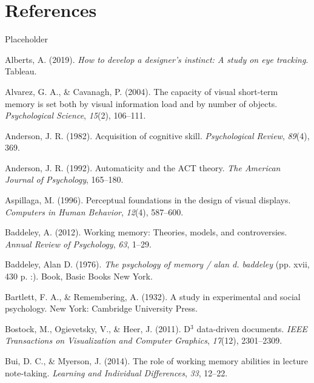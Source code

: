 \documentclass[print]{nuthesis}
\newlength{\cslhangindent}
\newenvironment{CSLReferences}[2]%
{\setlength{\parindent}{0pt}%
\everypar{\setlength{\hangindent}{\cslhangindent}}\ignorespaces}%
{\par}
\begin{document}
\hypertarget{references}{%
\chapter*{References}\label{references}}

Placeholder

\hypertarget{refs}{}
\begin{CSLReferences}{1}{0}
\leavevmode{}%
Alberts, A. (2019). \emph{How to develop a designer's instinct: A study on eye tracking}. Tableau.

\leavevmode{}%
Alvarez, G. A., \& Cavanagh, P. (2004). The capacity of visual short-term memory is set both by visual information load and by number of objects. \emph{Psychological Science}, \emph{15}(2), 106--111.

\leavevmode{}%
Anderson, J. R. (1982). Acquisition of cognitive skill. \emph{Psychological Review}, \emph{89}(4), 369.

\leavevmode{}%
Anderson, J. R. (1992). Automaticity and the ACT theory. \emph{The American Journal of Psychology}, 165--180.

\leavevmode{}%
Aspillaga, M. (1996). Perceptual foundations in the design of visual displays. \emph{Computers in Human Behavior}, \emph{12}(4), 587--600.

\leavevmode{}%
Baddeley, A. (2012). Working memory: Theories, models, and controversies. \emph{Annual Review of Psychology}, \emph{63}, 1--29.

\leavevmode{}%
Baddeley, Alan D. (1976). \emph{The psychology of memory / alan d. baddeley} (pp. xvii, 430 p. :). Book, Basic Books New York.

\leavevmode{}%
Bartlett, F. A., \& Remembering, A. (1932). A study in experimental and social psychology. New York: Cambridge University Press.

\leavevmode{}%
Bostock, M., Ogievetsky, V., \& Heer, J. (2011). D\(^3\) data-driven documents. \emph{IEEE Transactions on Visualization and Computer Graphics}, \emph{17}(12), 2301--2309.

\leavevmode{}%
Bui, D. C., \& Myerson, J. (2014). The role of working memory abilities in lecture note-taking. \emph{Learning and Individual Differences}, \emph{33}, 12--22.


\end{CSLReferences}
\end{document}
